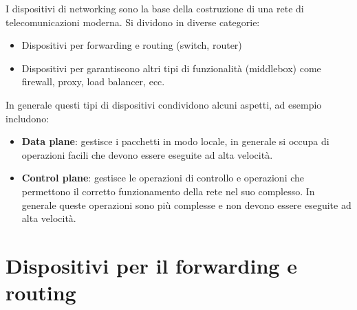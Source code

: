 I dispositivi di networking sono la base della costruzione di una rete di telecomunicazioni moderna.
Si dividono in diverse categorie:
\begin{itemize}
	\item Dispositivi per forwarding e routing (switch, router)
	\item Dispositivi per garantiscono altri tipi di funzionalità (middlebox) come firewall, proxy, load balancer, ecc.
\end{itemize}
In generale questi tipi di dispositivi condividono alcuni aspetti, ad esempio includono:
\begin{itemize}
	\item \textbf{Data plane}: gestisce i pacchetti in modo locale, in generale si occupa di operazioni facili che devono essere eseguite ad alta velocità.
	\item \textbf{Control plane}: gestisce le operazioni di controllo e operazioni che permettono il corretto funzionamento della rete nel suo complesso.
	In generale queste operazioni sono più complesse e non devono essere eseguite ad alta velocità.
\end{itemize}


\section{Dispositivi per il forwarding e routing}
